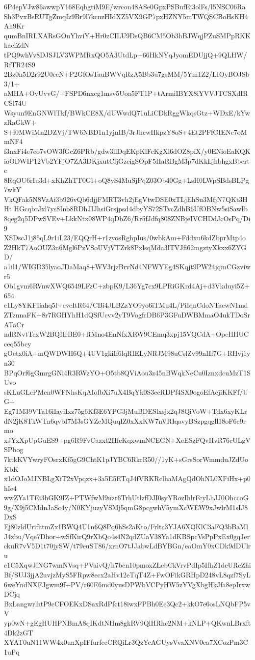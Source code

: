 6P4epVJw86awwpY168EqhgtiM9E/wrcon48ASe0GpxPSBufEi3olFs/l5NSC06Ra
Sh3PvxBsRUTgZmqIz9Br9l7kcnzHIdXZ5VX9GP7pxHZNY5mTWQSCBoHsKH4Ah9Kr
qumBnIRLXARsGOuYhviY+Hr0zCILU9DsQB6CM5Ob3hBJWqjPZuSMPpRKKkaelZdN
tPQ9whVv8DJSJLV3WPMRxQO5A3UtdLp+66HkNYqJyomEDUjjQ+9QLHW/RfTR24S9
2Bz0n5D2r92U0eeN+P2GfOsTauBWVqRzA5Bb3u7gsMM/5Ym1Z2/LIOyBOJSb3/1+
aMHA+OvUvvG/+FSPD6nxcg1msv5Uoa5FT1P+tArmiIBYX8iYVVJTCSXdIRCSl74U
Wsyun9EnGNWlTkf/BWkCE8X/dUWwdQ71uLiCDkRggWkqsGtz+WDxE/kYwzRaGkW+
S+f0MWiMn2DZVj/TW6NBD1n1yjnIB/3rJhcwHkpzY8oS+4Et2PFfGIENc7oMmNF4
f3nxFi4e7eo7vOW3fGcZ6PRb/gdw3llDqEKpKlFcKgXl6dOZ8piX/y0ENioEaKQK
ioODWIP12Vb2YFjO7ZA3DKjxutCljGzeigSOpF5HaRBgM3p7dKkLjhbhgxBbertc
8RqOU6rIu3d+xKhZhTT0Gl+oQ8yS4MuSjPqZ03Ob40Gg+LsH0LWpSBdsBLPg7wkY
VkQFak5N8VzAi3b926vQb6djjFMRT3vh2jEgVtwDSE0xTLjEhSu3MfjN7QKt3HHt
HGcqbrJxl7ys8Inb8RDhJIJhsiGrsjpsd4dbyYS72STvcZdhB6UfOBNw5siSawIb
8qeg2q5DPwSVEv+LkkNtx08WP4qDbZ6/Rr5fJdfq808ZNBjeIVCHDdJcOsPq/Di9
XSDscJ1j85qL9r1iL23/EQQrH+r1zyosRghpIus/0wbkAm+Fddxu6kdZbprMtp4o
Z2HkT7AoOUZ3n6Mgl6PzVSoUVjVTZrk8PxlsqMda3lTVJfi62mgztyXkxx6ZYGD/
a1il1/WIGD35lyaoJDaMaq8+WV3rjzBrvNd4NFWYEg4SKqjt9PW24jqmCGzviwr5
Ob1gvm6RVnwXWQ6549LFzC+zbpK9/L36Yg7cx9LPRiGKrd4Aj+d3Vkduyi5Z+654
c1Ly8YKFIiahq5l+cvcItR64/CBi4JLBZzYO9yo6iTMu4L/PiIqnCdoNTaewN1md
ZTznnaFK+8r7RGHYhH1dQSfUcvv2yT9VogfrDB6P3GFuDWBMmaO4ukTDoSrATaCr
ndRNvtTcxW2BQHrBE0+RMno4EnNfxXRW9CEmq3xpj15VQCdA+OpcHHUCceq55bcy
gOetx0iA+mQWDWH6Q+4UV1gkiIf6lqRIELyNRJM98uCslZv99nHf7G+RHvj1yn30
BPqOrf6gGmrgGNi4R3RWzYO+O5tb8QViAou3z45nBWqkNeCu0IznxdcuMzT1SUvo
sKLuGLcPMen0WFNhsKqAIofbXi7uX4BqYk0S3ecRDPf4SX9ogoEfAcjiKKFf/UG+
Eg71M39VTa16iIayiIxz75g6Kf3E6YPG3jMuBDESlxsjx2qJ8QiVoW+Tdx6xyKLr
dN2jK8TkWTn6qvbI7M3sGYZeMQuqIZ0xXxKW7nVRIqavyBSzpgqgll18oF6e9rmo
xJYxXpUpGuES9+pg6R9FvCazxt2HfeKqxwmNCEGN+XeESzFQvHvR76cULgVSPbog
7ktkKVYwryFOsrxKf5gG9ChtK1pJYBC6RkrR50//1yK+sGrsSorWmmduJZdUoKbK
x1dOJoMJNBLgXiT2xVpqzx+3a5E5ETqJ4fVRKRclhaMAgQdOhNL0XFiHx+p0hIe4
wwZYa1TEi3hGK9IZ+PTWfwM9uzr6TrhUtlzfDJI0syYRozIhlrFcyLhJJ0OhccoG
9g/X9j5CMdnJaSc4y/N0KYjuzyVSMj5qmG8pcgwhV5ymXcWEW9xJwlrM1sIJ8DxS
Ej80zldUrifhtmZx1BWQ4U1n6Q8Pq6hSs2aKto/Frltc3YJA6XQKlC3aFQ3bBaMl
J4zbu/Vqe7Dhor+wSfKirQ9rXbQo4s4N2qdZUaV38Ya1dKBSpcVsPpPxEx0gqJer
ckuR7vV5D1t70jySW/t79euST86/xrnO7tJJabwLdBYBGn/eaOmY0xCDk9dDUlru
c1C5XqwJiNG7wmNVsq+PVaivQ/h7ben10pmoxZLebCkVrvPdIp5IfhZ1deURcZhi
Bf/SUJ3jjA2uvjzMyS5FRpw8ecx2aHv12eTqT4Z+FwOFikGRHpD248vL8qzf7SyL
6weYndNXFJgwm9f+PV/r60E6md0yusDPWbVCPyHW5zYVgXbgHkJfa8epIrxwDCjq
BxLangwrlhtP9cCFOEKxDSaxRdPfct18iwxFPBh0Ec3Qc2+kkO7e6osLNQbFP5vV
yp0wN+gEgHUHPNBmA8qIKdtNHm8gkRV9QlHRhc2NM+kNLP+QKwnLBrxft4Dk2zGT
XYAT0uN11WW4x0unXpIFfurfeeCRQiLr3QzYcAGUysVvaXNV0ca7XCozPm3C1uPq
